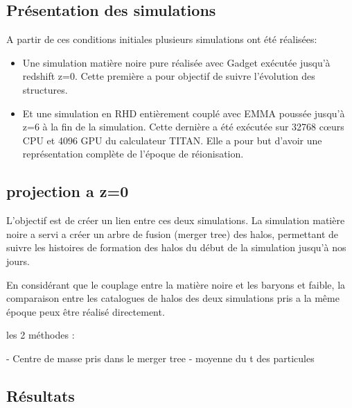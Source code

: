 

\subsection{Présentation des simulations}

A partir de ces conditions initiales plusieurs simulations ont été réalisées:

\begin{itemize}
\item Une simulation matière noire pure réalisée avec Gadget %
exécutée jusqu'à redshift z=0.
Cette première a pour objectif de suivre l'évolution des structures.

\item Et une simulation en RHD entièrement couplé avec EMMA poussée jusqu'à z=6 à la fin de la simulation.
Cette dernière a été exécutée sur 32768 cœurs CPU et 4096 GPU du calculateur TITAN.
Elle a pour but d'avoir une représentation complète de l'époque de réionisation.
\end{itemize}



\subsection{projection a z=0}


L'objectif est de créer un lien entre ces deux simulations.
La simulation matière noire a servi a créer un arbre de fusion (merger tree) des halos, permettant de suivre les histoires de formation des halos du début de la simulation jusqu'à nos jours.

En considérant que le couplage entre la matière noire et les baryons et faible, la comparaison entre les catalogues de halos des deux simulations pris a la même époque peux être réalisé directement.



les 2 méthodes :

- Centre de masse pris dans le merger tree
- moyenne du t des particules



\subsection{Résultats}


